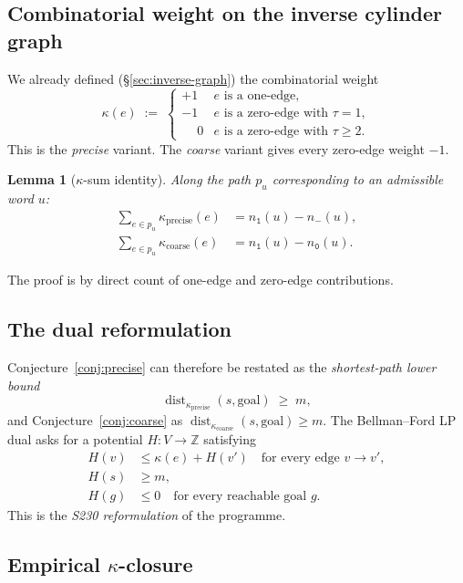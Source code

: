\documentclass[11pt,a4paper]{article}
\theoremstyle{plain}
\newtheorem{lemma}[theorem]{Lemma}
\theoremstyle{definition}
\newcommand{\ZZ}{\mathbb{Z}}
\newcommand{\numOnes}{n_{\mathtt{1}}}
\newcommand{\numNeg}{n_{\!-}}
\newcommand{\numZeros}{n_{\mathtt{0}}}
\begin{document}
\subsection{Combinatorial weight on the inverse cylinder graph}

We already defined (\S\ref{sec:inverse-graph}) the combinatorial
weight
\[
  \kappa(e) \;:=\;
  \begin{cases}
    +1 & e \text{ is a one-edge}, \\
    -1 & e \text{ is a zero-edge with } \tau = 1, \\
    \phantom{+}0 & e \text{ is a zero-edge with } \tau \ge 2.
  \end{cases}
\]
This is the \emph{precise} variant. The \emph{coarse} variant gives
every zero-edge weight $-1$.

\begin{lemma}[$\kappa$-sum identity]
\label{lem:kappa-sum}
Along the path $p_u$ corresponding to an admissible word $u$:
\begin{align*}
   \sum_{e \in p_u} \kappa_{\mathrm{precise}}(e) &= \numOnes(u) - \numNeg(u), \\
   \sum_{e \in p_u} \kappa_{\mathrm{coarse}}(e) &= \numOnes(u) - \numZeros(u).
\end{align*}
\end{lemma}

The proof is by direct count of one-edge and zero-edge contributions.

\subsection{The dual reformulation}

Conjecture~\ref{conj:precise} can therefore be restated as the
\emph{shortest-path lower bound}
\[
  \operatorname{dist}_{\kappa_{\mathrm{precise}}}(s, \mathrm{goal})
   \;\ge\; m,
\]
and Conjecture~\ref{conj:coarse} as
\(
  \operatorname{dist}_{\kappa_{\mathrm{coarse}}}(s, \mathrm{goal}) \ge m.
\)
The Bellman–Ford LP dual asks for a potential
$H : V \to \ZZ$ satisfying
\begin{align*}
  H(v) &\le \kappa(e) + H(v')   \quad \text{for every edge } v \to v', \\
  H(s) &\ge m, \\
  H(g) &\le 0 \quad \text{for every reachable goal } g.
\end{align*}
This is the \emph{S230 reformulation} of the programme.

\subsection{Empirical $\kappa$-closure}
\end{document}

